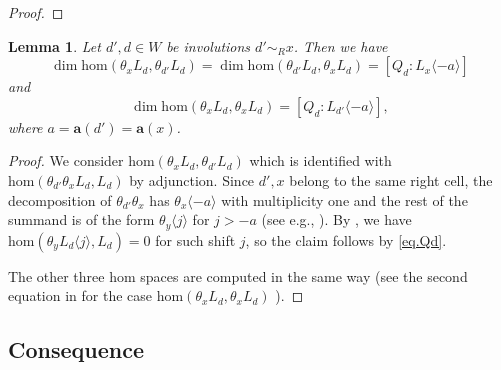 \documentclass[a4paper]{amsart}
\newtheorem{lemma}[theorem]{Lemma}
\def\HK#1{\textcolor[rgb]{.75,0.00,0.00}{[HK: #1]}}
\begin{document}
\begin{proof}

\end{proof}

\begin{lemma}\label{lem.adjunctioncomputation}
    Let $d',d\in W$ be involutions $d'\sim_R x$. Then we have
    \[\dim \mathrm{hom}(\theta_xL_d,\theta_{d'} L_d)= \dim \mathrm{hom}(\theta_{d'}L_d,\theta_x L_d) =[Q_d:L_x\langle -{a}\rangle]\]
    and 
    \[\dim \mathrm{hom}(\theta_xL_d,\theta_{x} L_d) =[Q_d:L_{d'}\langle -a\rangle],\]
    where $a= \mathbf{a}(d')=\mathbf{a}(x)$.
\end{lemma}
\begin{proof}
    We consider $\mathrm{hom}(\theta_xL_d,\theta_{d'} L_d)$ which is identified with $\mathrm{hom}(\theta_{d'}\theta_xL_d,L_d)$ by adjunction.
    Since $d',x$ belong to the same right cell, the decomposition of $\theta_{d'}\theta_x$ has $ \theta_x\langle -a \rangle $ with multiplicity one and the rest of the summand is of the form $\theta_y\langle j \rangle$ for $j>-a$ (see e.g., \cite[Lemma 3.2]{KMM}).
    By \cite[Theorem~2.2]{KMM}, 
we have
$\mathrm{hom}(\theta_yL_d\langle j\rangle,L_d)=0$
for such shift $j$, so the claim follows by \eqref{eq.Qd}.

The other three hom spaces are computed in the same way (see the second equation in \cite[Lemma 3.2]{KMM} for the case $\mathrm{hom}(\theta_xL_d,\theta_{x} L_d)$ ).
\end{proof}

\subsection{Consequence}\label{s4.4}
\end{document}
